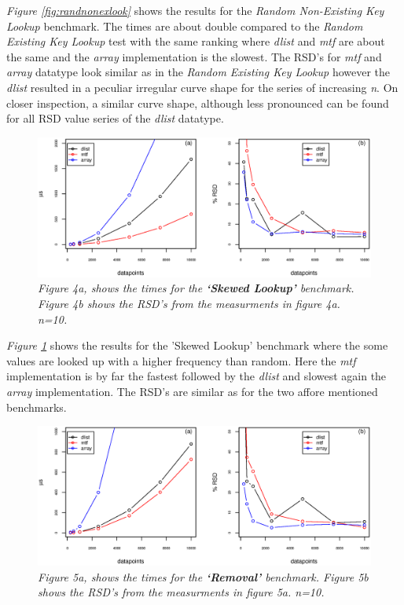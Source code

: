\documentclass[a4paper,11pt,twoside]{article}
\begin{document}
\textit{Figure \ref{fig:randnonexlook}} shows the results for the
\emph{Random Non-Existing Key Lookup} benchmark. The times are about double
compared to the \emph{Random Existing Key Lookup} test with the same
ranking where \emph{dlist} and \emph{mtf} are about the same and the \emph{array}
implementation is the slowest. The RSD's for \emph{mtf} and \emph{array}
datatype look similar as in the \emph{Random Existing Key Lookup} however
the \emph{dlist} resulted in a peculiar irregular curve shape for the
series of increasing \textit{n}. On closer inspection, a similar curve
shape, although less pronounced can be found for all RSD value series
of the \emph{dlist} datatype.

\begin{figure}[H] 
\centering 
\includegraphics[width=\textwidth]{figures/fig4.eps}
\caption{\textit{Figure 4a, shows the times for the \textbf{`Skewed
      Lookup'} benchmark. Figure 4b shows the RSD's from the
    measurments in figure 4a. n=10.}}
\label{fig:skewed}
\end{figure}

\textit{Figure \ref{fig:skewed}} shows the results for the 'Skewed
Lookup' benchmark where the some values are looked up with a higher
frequency than random. Here the \emph{mtf} implementation is by far the
fastest followed by the \emph{dlist} and slowest again the \emph{array}
implementation. The RSD's are similar as for the two affore mentioned
benchmarks.


\begin{figure}[H] 
\centering 
\includegraphics[width=\textwidth]{figures/fig5.eps}
\caption{\textit{Figure 5a, shows the times for the \textbf{`Removal'}
    benchmark. Figure 5b shows the RSD's from the measurments in figure 5a. n=10.}}
\label{fig:remove}
\end{figure}
\end{document}

